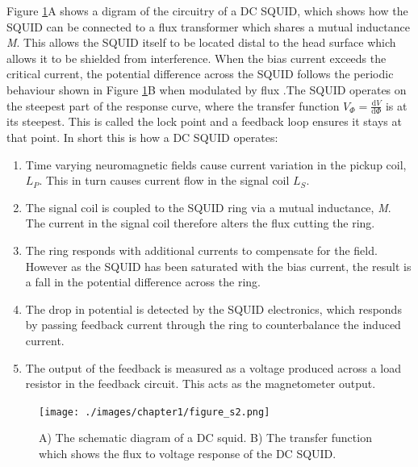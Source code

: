 Figure \ref{fig_1_s2}A shows a digram of the circuitry of a DC SQUID, which shows how the SQUID can be connected to a flux transformer which shares a mutual inductance \textit{M}. This allows the SQUID itself to be located distal to the head surface which allows it to be shielded from interference. When the bias current exceeds the critical current, the potential difference across the SQUID follows the periodic behaviour shown in Figure \ref{fig_1_s2}B when modulated by flux .The SQUID operates on the steepest part of the response curve, where the transfer function $V_\Phi = \frac{\text{d}V}{\text{d}\Phi}$ is at its steepest. This is called the lock point and a feedback loop ensures it stays at that point. In short this is how a DC SQUID operates:

\begin{enumerate}
	\item Time varying neuromagnetic fields cause current variation in the pickup coil, $L_P$. This in turn causes current flow in the signal coil $L_S$.
	\item The signal coil is coupled to the SQUID ring via a mutual inductance, \textit{M}. The current in the signal coil therefore alters the flux cutting the ring.
	\item The ring responds with additional currents to compensate for the field. However as the SQUID has been saturated with the bias current, the result is a fall in the potential difference across the ring.
	\item The drop in potential is detected by the SQUID electronics, which responds by passing feedback current through the ring to counterbalance the induced current.
	\item The output of the feedback is measured as a voltage produced across a load resistor in the feedback circuit. This acts as the magnetometer output. 
\end{enumerate} 

\begin{figure}
	\begin{center}
		\texttt{[image: ./images/chapter1/figure\_s2.png]}\caption{A) The schematic diagram of a DC squid. B) The transfer function which shows the flux to voltage response of the DC SQUID.}\label{fig_1_s2}
	\end{center}
\end{figure}


